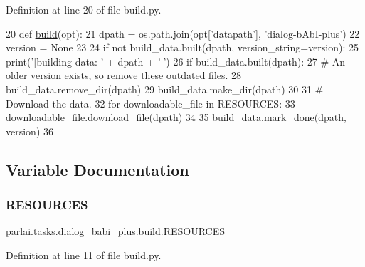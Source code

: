 Definition at line 20 of file build.\+py.


\begin{DoxyCode}
20 \textcolor{keyword}{def }\hyperlink{namespacedialog__babi__feedback_1_1build_a7a9d289f7493a5ded13c4b7f071b6184}{build}(opt):
21     dpath = os.path.join(opt[\textcolor{stringliteral}{'datapath'}], \textcolor{stringliteral}{'dialog-bAbI-plus'})
22     version = \textcolor{keywordtype}{None}
23 
24     \textcolor{keywordflow}{if} \textcolor{keywordflow}{not} build\_data.built(dpath, version\_string=version):
25         print(\textcolor{stringliteral}{'[building data: '} + dpath + \textcolor{stringliteral}{']'})
26         \textcolor{keywordflow}{if} build\_data.built(dpath):
27             \textcolor{comment}{# An older version exists, so remove these outdated files.}
28             build\_data.remove\_dir(dpath)
29         build\_data.make\_dir(dpath)
30 
31         \textcolor{comment}{# Download the data.}
32         \textcolor{keywordflow}{for} downloadable\_file \textcolor{keywordflow}{in} RESOURCES:
33             downloadable\_file.download\_file(dpath)
34 
35         build\_data.mark\_done(dpath, version)
36 \end{DoxyCode}


\subsection{Variable Documentation}
\mbox{\label{namespaceparlai_1_1tasks_1_1dialog__babi__plus_1_1build_afe5f8e77bf50e50d0e281f06d609c856}} 
\subsubsection{\texorpdfstring{R\+E\+S\+O\+U\+R\+C\+ES}{RESOURCES}}
{\footnotesize\ttfamily parlai.\+tasks.\+dialog\+\_\+babi\+\_\+plus.\+build.\+R\+E\+S\+O\+U\+R\+C\+ES}



Definition at line 11 of file build.\+py.

